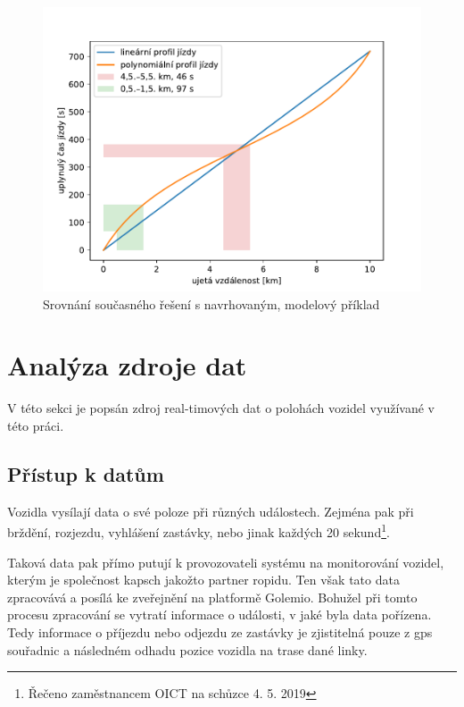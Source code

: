 \begin{figure}
	\centering
  \includegraphics[width=\linewidth]{../img/lin_vs_poly}
  \caption{Srovnání současného řešení s navrhovaným, modelový příklad}
  \label{fig:lin_vs_poly}
\end{figure}

\section{Analýza zdroje dat} \label{chapter:analyza_zdroje}

V této sekci je popsán zdroj real-timových dat o polohách vozidel využívané v této práci.

\subsection{Přístup k datům}

Vozidla vysílají data o své poloze při různých událostech. Zejména pak při brždění, rozjezdu, vyhlášení zastávky, nebo jinak každých 20 sekund\footnote{Řečeno zaměstnancem OICT na schůzce 4. 5. 2019}.

\bigbreak

Taková data pak přímo putují k provozovateli systému na monitorování vozidel, kterým je společnost \gls{kapsch} jakožto partner \gls{ropid}u. Ten však tato data zpracovává a posílá ke zveřejnění na platformě Golemio. Bohužel při tomto procesu zpracování se vytratí informace o události, v jaké byla data pořízena. Tedy informace o příjezdu nebo odjezdu ze zastávky je zjistitelná pouze z \gls{gps} souřadnic a následném odhadu pozice vozidla na trase dané linky.

